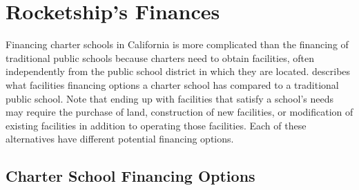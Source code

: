 \section{Rocketship's Finances}\label{sec:rocketship_finances}\indent

Financing charter schools in California is more complicated than the financing of traditional public schools because charters need to obtain facilities, often independently from the public school district in which they are located.
  describes what facilities financing options a charter school has compared to a traditional public school. Note that ending up with facilities that satisfy a school's needs may require the purchase of land, construction of new facilities, or modification of existing facilities in addition to operating those facilities. Each of these alternatives have different potential financing  options.

\subsection{Charter School Financing Options}\indent\label{sec:charter-school-financing-options}

